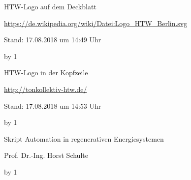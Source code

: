\documentclass[
	pagesize,
	fontsize=12pt,
	paper=a4,
	oneside,
    reqno
]{scrartcl}
\numberwithin{equation}{section} %
\numberwithin{table}{section} %
\numberwithin{figure}{section} %
\begin{document}










\newpage
\newcount\Quellennummer
{}

\renewcommand\refname{Literaturverzeichnis}

\begin{thebibliography}{999}
{\setlength{\emergencystretch}{3cm}%

HTW-Logo auf dem Deckblatt\par
\url{https://de.wikipedia.org/wiki/Datei:Logo_HTW_Berlin.svg} \par
 Stand: 17.08.2018 um 14:49 Uhr

\advance\Quellennummer by 1
 
HTW-Logo in der Kopfzeile\par
\url{http://tonkollektiv-htw.de/} \par
 Stand: 17.08.2018 um 14:53 Uhr

\advance\Quellennummer by 1

Skript Automation in regenerativen Energiesystemen\par
Prof.\xspace Dr.\xspace -Ing.\xspace Horst Schulte

\advance\Quellennummer by 1

}
\end{thebibliography}
\end{document}
